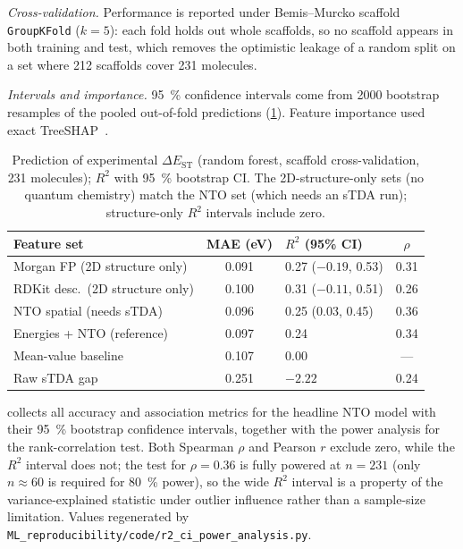 \documentclass[twoside,twocolumn,9pt]{extarticle}
\begin{document}
\emph{Cross-validation.} Performance is reported under Bemis--Murcko scaffold
\texttt{GroupKFold} ($k=5$): each fold holds out whole scaffolds, so no scaffold
appears in both training and test, which removes the optimistic leakage of a
random split on a set where \num{212} scaffolds cover \num{231} molecules.

\emph{Intervals and importance.} \qty{95}{\percent} confidence intervals come from
\num{2000} bootstrap resamples of the pooled out-of-fold predictions
(\cref{tab:model_metrics}). Feature importance used exact TreeSHAP~\cite{Lundberg2017}.

\begin{table}[htbp]
  \centering
  \caption{Prediction of experimental $\Delta E_\text{ST}$ (random forest,
    scaffold cross-validation, \num{231} molecules); $R^2$ with \qty{95}{\percent}
    bootstrap CI. The 2D-structure-only sets (no quantum chemistry) match the NTO
    set (which needs an sTDA run); structure-only $R^2$ intervals include zero.}
  \label{tab:model_metrics}
  \small
  \begin{tabular}{@{}l@{}clc@{}}
    \toprule
    Feature set & MAE (eV) & $R^2$ (95\% CI) & $\rho$ \\
    \midrule
    Morgan FP (2D structure only)   & 0.091 & 0.27 ($-0.19$, 0.53) & 0.31 \\
    RDKit desc.\ (2D structure only) & 0.100 & 0.31 ($-0.11$, 0.51) & 0.26 \\
    NTO spatial (needs sTDA)        & 0.096 & 0.25 (0.03, 0.45) & 0.36 \\
    Energies + NTO (reference)      & 0.097 & 0.24 & 0.34 \\
    Mean-value baseline             & 0.107 & 0.00 & --- \\
    Raw sTDA gap                    & 0.251 & $-2.22$ & 0.24 \\
    \bottomrule
  \end{tabular}
\end{table}

 collects all accuracy and association metrics for the
headline NTO model with their \qty{95}{\percent} bootstrap confidence intervals,
together with the power analysis for the rank-correlation test. Both Spearman
$\rho$ and Pearson $r$ exclude zero, while the $R^2$ interval does not; the
test for $\rho = 0.36$ is fully powered at $n = 231$ (only $n \approx 60$ is
required for \qty{80}{\percent} power), so the wide $R^2$ interval is a property
of the variance-explained statistic under outlier influence rather than a
sample-size limitation. Values regenerated by
\texttt{ML\_reproducibility/code/r2\_ci\_power\_analysis.py}.
\end{document}
